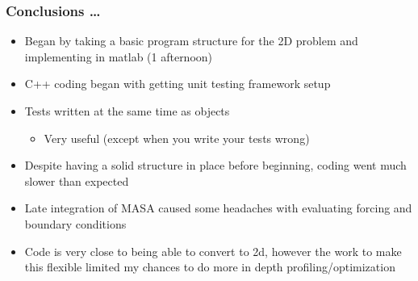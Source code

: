 \documentclass[unknownkeysallowed,12pt,mathserif]{beamer}
\begin{document}
\begin{frame}
\frametitle{Conclusions \ldots}

\begin{itemize}
\item Began by taking a basic program structure for the 2D problem and implementing in matlab (1 afternoon)
\item C++ coding began with getting unit testing framework setup
\item Tests written at the same time as objects
\begin{itemize}
\item Very useful (except when you write your tests wrong)
\end{itemize}
\item Despite having a solid structure in place before beginning, coding went much slower than expected
\item Late integration of MASA caused some headaches with evaluating forcing and boundary conditions
\item Code is very close to being able to convert to 2d, however the work to make this flexible limited my chances to do more in depth profiling/optimization
\end{itemize}

\end{frame}


\begin{frame}
\frametitle{}
\begin{block}{}
 \\
\end{block}
\end{frame}

 
\end{document}

